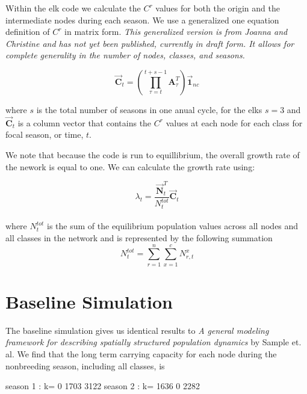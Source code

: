 \documentclass[10pt]{article}
\begin{document}
Within the elk code we calculate the $C^r$ values for both the origin and the intermediate nodes during each season. We use a generalized one equation definition of $C^r$ in matrix form. {\it{This generalized version is from Joanna and Christine and has not yet been published, currently in draft form. It allows for complete generality in the number of nodes, classes, and seasons.}}

\begin{equation}
\vec{\mathbf{C}}_t=\left(\prod_{\tau=t}^{t+s-1}\mathbf{A}_\tau^T\right)\vec{\mathbf{1}}_{nc}
\end{equation}

where $s$ is the total number of seasons in one anual cycle, for the elks $s=3$ and $\vec{\mathbf{C}}_t$ is a column vector that contains the $C^r$ values at each node for each class for focal season, or time, $t$. 

We note that because the code is run to equillibrium, the overall growth rate of the nework is equal to one. We can calculate the growth rate using:

\begin{equation}
\lambda_t= \frac{\vec{\mathbf{N}}_t^T}{N_t^{tot}}\vec{\mathbf{C}}_t
\label{lambda}
\end{equation}\\
where $N_t^{tot}$ is the sum of the equilibrium population values across all nodes and all classes in the network and is represented by the following summation
\begin{equation}
N_t^{tot}=\sum_{r=1}^n\sum_{x=1}^{c}N^x_{r,t}
\end{equation}

\section{Baseline Simulation}
% 
The baseline simulation gives us identical results to {\it{A general modeling framework for describing spatially
structured population dynamics}} by Sample et. al. We find that the long term carrying capacity for each node during the nonbreeding season, including all classes, is

\begin{Schunk}
\begin{Soutput}
season 1 : k= 0 1703 3122
season 2 : k= 1636 0 2282
\end{Soutput}
\end{Schunk}
\end{document}
